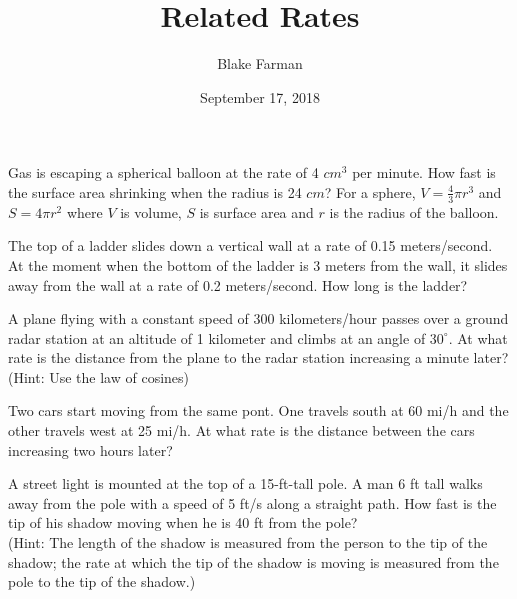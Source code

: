 \documentclass[10pt]{amsart}
\title{Related Rates}
\date{September 17, 2018}
\author{Blake Farman}
\begin{document}
\maketitle

\makenameslot

\begin{thm}
  Gas is escaping a spherical balloon at the rate of 4 \(cm^3\) per minute.  How fast is the surface area shrinking when the radius is 24 \(cm\)?  For a sphere, \(\displaystyle{V=\frac{4}{3}\pi r^3}\) and \(\displaystyle{S=4\pi r^2}\) where \(V\) is volume, \(S\) is surface area and \(r\) is the radius of the balloon.
\end{thm}

\newpage
\begin{thm}
  The top of a ladder slides down a vertical wall at a rate of 0.15 meters/second.
  At the moment when the bottom of the ladder is 3 meters from the wall, it slides away from the wall at a rate of 0.2 meters/second.
  How long is the ladder?
\end{thm}

\vspace{3in}

\begin{thm}
  A plane flying with a constant speed of 300 kilometers/hour passes over a ground radar station at an altitude of 1 kilometer and climbs at an angle of \(30^\circ\).
  At what rate is the distance from the plane to the radar station increasing a minute later?\\
  (Hint: Use the law of cosines)
\end{thm}
\newpage
\begin{thm}
  Two cars start moving from the same pont.
  One travels south at 60 mi/h and the other travels west at 25 mi/h.
  At what rate is the distance between the cars increasing two hours later?
\end{thm}

\vspace{3in}
\begin{thm}
  A street light is mounted at the top of a 15-ft-tall pole.
  A man 6 ft tall walks away from the pole with a speed of 5 ft/s along a straight path.
  How fast is the tip of his shadow moving when he is 40 ft from the pole?\\
  (Hint: The length of the shadow is measured from the person to the tip of the shadow; the rate at which the tip of the shadow is moving is measured from the pole to the tip of the shadow.)
\end{thm}
\end{document}
